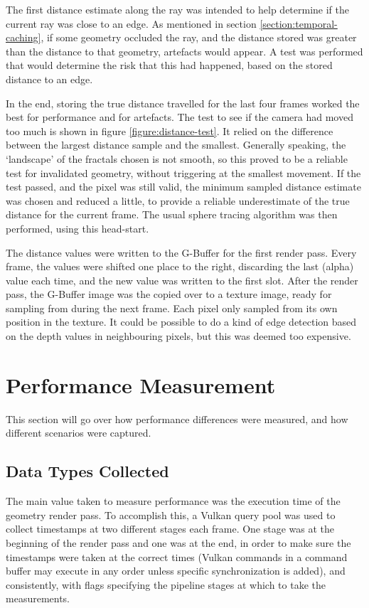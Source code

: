 The first distance estimate along the ray was intended to help determine if the current ray was close to an edge. As mentioned in section \ref{section:temporal-caching}, if some geometry occluded the ray, and the distance stored was greater than the distance to that geometry, artefacts would appear. A test was performed that would determine the risk that this had happened, based on the stored distance to an edge.\newline

In the end, storing the true distance travelled for the last four frames worked the best for performance and for artefacts. The test to see if the camera had moved too much is shown in figure \ref{figure:distance-test}. It relied on the difference between the largest distance sample and the smallest. Generally speaking, the `landscape' of the fractals chosen is not smooth, so this proved to be a reliable test for invalidated geometry, without triggering at the smallest movement. If the test passed, and the pixel was still valid, the minimum sampled distance estimate was chosen and reduced a little, to provide a reliable underestimate of the true distance for the current frame. The usual sphere tracing algorithm was then performed, using this head-start.\newline

The distance values were written to the G-Buffer for the first render pass. Every frame, the values were shifted one place to the right, discarding the last (alpha) value each time, and the new value was written to the first slot. After the render pass, the G-Buffer image was the copied over to a texture image, ready for sampling from during the next frame. Each pixel only sampled from its own position in the texture. It could be possible to do a kind of edge detection based on the depth values in neighbouring pixels, but this was deemed too expensive.

\section{Performance Measurement}

This section will go over how performance differences were measured, and how different scenarios were captured.

\subsection{Data Types Collected}

The main value taken to measure performance was the execution time of the geometry render pass. To accomplish this, a Vulkan query pool was used to collect timestamps at two different stages each frame. One stage was at the beginning of the render pass and one was at the end, in order to make sure the timestamps were taken at the correct times (Vulkan commands in a command buffer may execute in any order unless specific synchronization is added), and consistently, with flags specifying the pipeline stages at which to take the measurements.\newline

